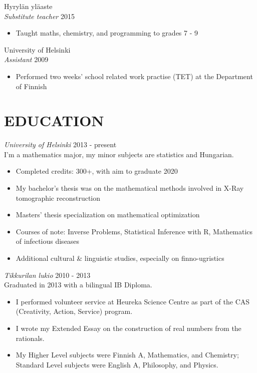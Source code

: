 \documentclass[margin, 10pt]{res} %
\begin{document}
\begin{resume}
\addvspace{-7pt}
Hyrylän yläaste\\
{\sl Substitute teacher} \hfill 2015
\begin{itemize} \itemsep -2pt %
\item Taught maths, chemistry, and programming to grades 7 - 9
\end{itemize}
\addvspace{-7pt}
University of Helsinki\\
{\sl Assistant} \hfill 2009
\begin{itemize} \itemsep -2pt %
\item Performed two weeks' school related work practise (TET) at the Department of Finnish
\end{itemize}
  

\section{EDUCATION}

{\sl University of Helsinki} \hfill 2013 - present\\
I'm a mathematics major, my minor subjects are statistics and Hungarian.
\begin{itemize} \itemsep -2pt
\item Completed credits: 300+, with aim to graduate 2020
\item My bachelor's thesis was on the mathematical methods involved in X-Ray tomographic reconstruction
\item Masters' thesis specialization on mathematical optimization
\item Courses of note: Inverse Problems, Statistical Inference with R, Mathematics of infectious diseases
\item Additional cultural \& linguistic studies, especially on finno-ugristics
\end{itemize}

\addvspace{-7pt}
{\sl Tikkurilan lukio} \hfill 2010 - 2013\\
Graduated in 2013 with a bilingual IB Diploma.
\begin{itemize} \itemsep -2pt
\item I performed volunteer service at Heureka Science Centre as part of the CAS (Creativity, Action, Service) program.
\item I wrote my Extended Essay on the construction of real numbers from the rationals.
\item My Higher Level subjects were Finnish A, Mathematics, and Chemistry; Standard Level subjects were English A, Philosophy, and Physics. 
\end{itemize}


\end{resume}
\end{document}
